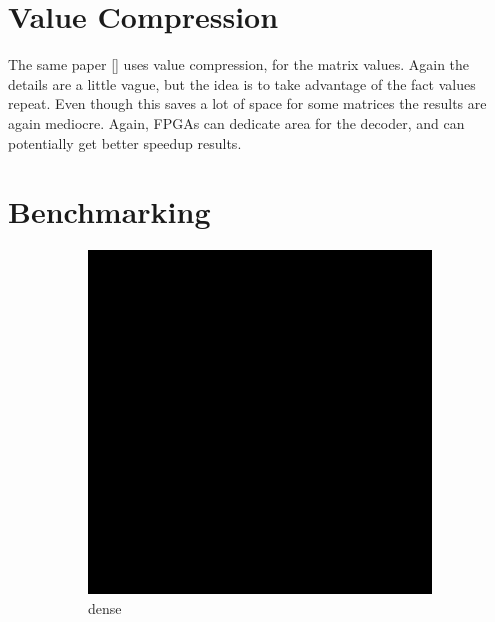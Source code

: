 \section{Value Compression}
\par The same paper [\cite{prelim:kourtis}] uses value compression, for the matrix values. Again the details are a little vague, but the idea is to take advantage of the fact values repeat. Even though this saves a lot of space for some matrices the results are again mediocre. Again, FPGAs can dedicate area for the decoder, and can potentially get better speedup results.

\section{Benchmarking}
\begin{figure}
\begin{multicols}{4}
\begin{subfigure}{\linewidth}
\includegraphics[width=\linewidth]{images/dense}
\caption{dense}
\end{subfigure}~%
\begin{subfigure}{\linewidth}

\end{subfigure}
\end{multicols}
\end{figure}
